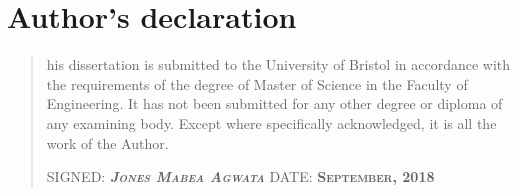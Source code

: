 %
%
%
%
%
%
\chapter*{Author's declaration}
\begin{SingleSpace}
\begin{quote}
his dissertation is submitted to the University of Bristol in accordance with the requirements of the degree of Master of Science in the Faculty of Engineering. It has not been submitted for any
other degree or diploma of any examining body. Except where specifically acknowledged, it is all
the work of the Author.

\vspace{1.5cm}
\noindent
\hspace{-0.75cm}\textsc{SIGNED: \textit{\textbf{Jones Mabea Agwata}}   DATE: \textbf{September, 2018}}
\end{quote}
\end{SingleSpace}
\clearpage